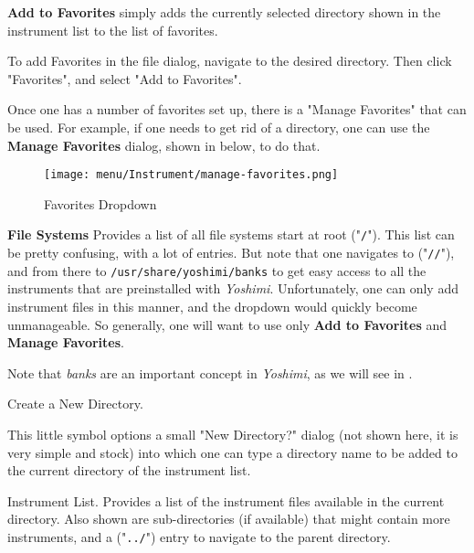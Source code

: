    \textbf{Add to Favorites} 
   simply adds the currently selected directory shown in the instrument list
   to the list of favorites.

   To add Favorites in the file dialog,
   navigate to the desired directory.  Then click "Favorites", and select
   "Add to Favorites".

   Once one has a number of favorites set up,
   there is a "Manage Favorites" that can be used.
   For example, if one needs to get rid of a directory, one can use the
   \textbf{Manage Favorites}
   dialog, shown in
    below,
   to do that.

\begin{figure}[H]
   \centering 
   \texttt{[image: menu/Instrument/manage-favorites.png]}
   \caption{Favorites Dropdown}
   \label{fig:manage_instrument_favorites}
\end{figure}

   \textbf{File Systems} 
   Provides a list of all file systems start at root ("\texttt{/}").
   This list can be pretty confusing, with a lot of entries.
   But note that one navigates to ("\texttt{//}"), and from there to
   \texttt{/usr/share/yoshimi/banks} to get easy access to all the
   instruments that are preinstalled with
   \textsl{Yoshimi}.  Unfortunately, one can only add instrument
   files in this manner, and the dropdown would quickly become
   unmanageable.  So generally, one will want to use only
   \textbf{Add to Favorites} and \textbf{Manage Favorites}.

   Note that \textsl{banks} are an important concept in
   \textsl{Yoshimi}, as we will see in
   .

   Create a New Directory.

   This little symbol options a small "New Directory?" dialog (not shown
   here, it is very simple and stock) into which one can type a directory
   name to be added to the current directory of the instrument list.

   Instrument List.
   Provides a list of the instrument files available in the current
   directory.  Also shown are sub-directories (if available)
   that might contain more instruments, and a ("\texttt{../}") entry
   to navigate to the parent directory.

